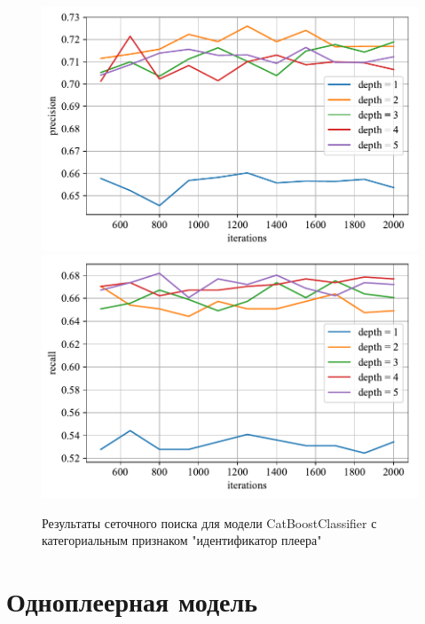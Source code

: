 \begin{figure}
    \centering
    \includegraphics{../images/toloka_catboost_with_cat_precision.pdf}
    \includegraphics{../images/toloka_catboost_with_cat_recall.pdf}
    \caption{Результаты сеточного поиска для модели CatBoostClassifier с  категориальным признаком "идентификатор плеера"}
    \label{fig:toloka_catboost_with_cat}
\end{figure}

\section{Одноплеерная модель}

